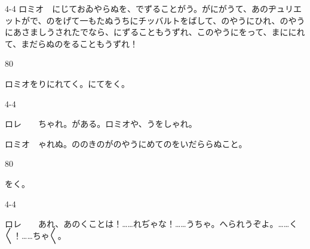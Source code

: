 \documentclass[tate,paper=b6j,jafontsize=9pt]{jlreq}
\begin{document}
\begin{azconvIndented}{4\zw}{-4\zw}
ロミオ　にじておゐやらぬを、でずることがう。がにがうて、あのヂュリエットがで、のをげて一もたぬうちにチッバルトをばして、のやうにひれ、のやうにあさましうされたでなら、にずることもうずれ、このやうにをって、まににれて、まだらぬのをることもうずれ！

\end{azconvIndented}
\begin{azconvIndented}{8\zw}{0\zw}

ロミオをりにれてく。にてをく。

\end{azconvIndented}
\begin{azconvIndented}{4\zw}{-4\zw}

ロレ　　ちゃれ。がある。ロミオや、うをしゃれ。

ロミオ　ゃれぬ。ののきのがのやうにめてのをいだららぬこと。

\end{azconvIndented}
\begin{azconvIndented}{8\zw}{0\zw}

をく。

\end{azconvIndented}
\begin{azconvIndented}{4\zw}{-4\zw}

ロレ　　あれ、あのくことは！……れぢゃな！……うちゃ。へられうぞよ。……く{〳〵}！……ちゃ{〳〵}。

\end{azconvIndented}
\end{document}
